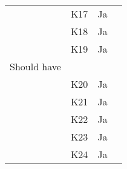 \documentclass[class=article, crop=false]{standalone}
\begin{document}
\begin{table}[]
\begin{tabular}{llll}
            & K17            & Ja                 &                                                                                                                                                                                                    \\
            & K18            & Ja                 &                                                                                                                                                                                                    \\
            & K19            & Ja                 &                                                                                                                                                                                                    \\
            Should have     &                &                    &                                                                                                                                                                                                    \\
            & K20            & Ja                 &                                                                                                                                                                                                    \\
            & K21            & Ja                 &                                                                                                                                                                                                    \\
            & K22            & Ja                 &                                                                                                                                                                                                    \\
            & K23            & Ja                 &                                                                                                                                                                                                    \\
            & K24            & Ja                 &                                                                                                                                                                                                    \\

\end{tabular}
\end{table}
\end{document}
